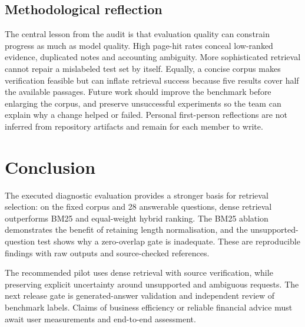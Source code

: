 \documentclass[11pt,a4paper]{article}
\begin{document}
\subsection{Methodological reflection}
The central lesson from the audit is that evaluation quality can constrain progress as much as model quality. High page-hit rates conceal low-ranked evidence, duplicated notes and accounting ambiguity. More sophisticated retrieval cannot repair a mislabeled test set by itself. Equally, a concise corpus makes verification feasible but can inflate retrieval success because five results cover half the available passages. Future work should improve the benchmark before enlarging the corpus, and preserve unsuccessful experiments so the team can explain why a change helped or failed. Personal first-person reflections are not inferred from repository artifacts and remain for each member to write.

\section{Conclusion}
The executed diagnostic evaluation provides a stronger basis for retrieval selection: on the fixed corpus and 28 answerable questions, dense retrieval outperforms BM25 and equal-weight hybrid ranking. The BM25 ablation demonstrates the benefit of retaining length normalisation, and the unsupported-question test shows why a zero-overlap gate is inadequate. These are reproducible findings with raw outputs and source-checked references.

The recommended pilot uses dense retrieval with source verification, while preserving explicit uncertainty around unsupported and ambiguous requests. The next release gate is generated-answer validation and independent review of benchmark labels. Claims of business efficiency or reliable financial advice must await user measurements and end-to-end assessment.
\end{document}
